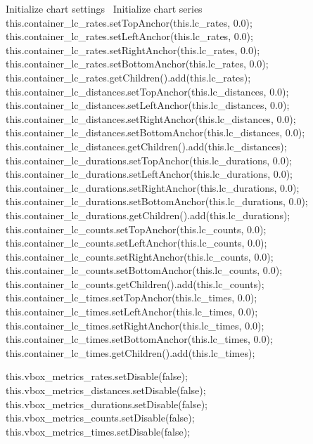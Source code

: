 \nwenddocs{}\endmoddef{}
\LA{}Initialize chart settings~{\nwtagstyle{}}\RA{}
\LA{}Initialize chart series~{\nwtagstyle{}}\RA{}
this.container_lc_rates.setTopAnchor(this.lc_rates, 0.0);
this.container_lc_rates.setLeftAnchor(this.lc_rates, 0.0);
this.container_lc_rates.setRightAnchor(this.lc_rates, 0.0);
this.container_lc_rates.setBottomAnchor(this.lc_rates, 0.0);
this.container_lc_rates.getChildren().add(this.lc_rates);
this.container_lc_distances.setTopAnchor(this.lc_distances, 0.0);
this.container_lc_distances.setLeftAnchor(this.lc_distances, 0.0);
this.container_lc_distances.setRightAnchor(this.lc_distances, 0.0);
this.container_lc_distances.setBottomAnchor(this.lc_distances, 0.0);
this.container_lc_distances.getChildren().add(this.lc_distances);
this.container_lc_durations.setTopAnchor(this.lc_durations, 0.0);
this.container_lc_durations.setLeftAnchor(this.lc_durations, 0.0);
this.container_lc_durations.setRightAnchor(this.lc_durations, 0.0);
this.container_lc_durations.setBottomAnchor(this.lc_durations, 0.0);
this.container_lc_durations.getChildren().add(this.lc_durations);
this.container_lc_counts.setTopAnchor(this.lc_counts, 0.0);
this.container_lc_counts.setLeftAnchor(this.lc_counts, 0.0);
this.container_lc_counts.setRightAnchor(this.lc_counts, 0.0);
this.container_lc_counts.setBottomAnchor(this.lc_counts, 0.0);
this.container_lc_counts.getChildren().add(this.lc_counts);
this.container_lc_times.setTopAnchor(this.lc_times, 0.0);
this.container_lc_times.setLeftAnchor(this.lc_times, 0.0);
this.container_lc_times.setRightAnchor(this.lc_times, 0.0);
this.container_lc_times.setBottomAnchor(this.lc_times, 0.0);
this.container_lc_times.getChildren().add(this.lc_times);
\nwendcode{}\nwdocspar

\nwenddocs{}\endmoddef{}
this.vbox_metrics_rates.setDisable(false);
this.vbox_metrics_distances.setDisable(false);
this.vbox_metrics_durations.setDisable(false);
this.vbox_metrics_counts.setDisable(false);
this.vbox_metrics_times.setDisable(false);
\nwendcode{}\nwdocspar

